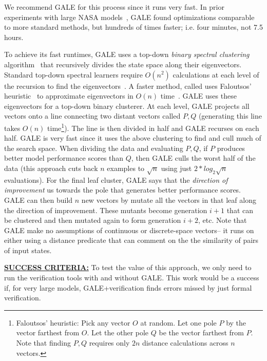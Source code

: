 \documentclass[12pt]{article}
\begin{document}
We recommend GALE for this process since it runs very fast.
In prior experiments with large NASA models~\cite{me15z}, GALE  found optimizations comparable to more standard methods, but hundreds of times faster; i.e. four minutes, not 7.5 hours.


To achieve its fast runtimes,
GALE uses  a top-down  {\em binary spectral clustering} algorithm~\cite{kamvar03} 
that recursively divides
the state space along their eigenvectors.
Standard top-down spectral learners require  $O(n^2)$ calculations at each level 
of the recursion to find the eigenvectors~\cite{boley98}. A faster method, called  
uses Faloutsos'  heuristic~\cite{Faloutsos1995} to
approximate eigenvectors   in $O(n)$ time~\cite{platt05}.
GALE uses these eigenvectors for a top-down binary clusterer. 
At each level, GALE  projects all  vectors onto a line connecting two distant vectors called $P,Q$ (generating this line takes $O(n)$ time\footnote{Faloutsos’ heuristic: Pick any vector $O$ at random. Let one pole $P$ by the
vector farthest from $O$. Let the other pole $Q$ be the vector farthest from $P$. Note that
finding $P,Q$ requires only $2n$ distance calculations across $n$ vectors.}).
The line is then divided in half
and GALE recurses on each half. 
GALE is very fast since it uses the above clustering to find and cull much of the  search space. When dividing the data and  evaluating   $P,Q$, if $P$ produces better model performance scores than $Q$, then GALE  culls   the worst half of the data (this approach cuts back $n$ examples to $\sqrt{n}$ using just $2*log_2{\sqrt{n}}$ evaluations).  For the final leaf cluster, GALE says that the {\em direction of improvement} us towards the pole that generates better performance scores. GALE can then build $n$ new vectors by mutate all the vectors in that leaf along the direction of improvement. These mutants become generation $i+1$ that can be clustered  and then mutated again to form generation $i+2$, etc. Note that  GALE make no assumptions of continuous or discrete-space vectors-- it runs on either using a distance predicate that can comment on the the similarity of pairs of input states. 

 
\underline{{\bf  SUCCESS CRITERIA:}}  To test
the value of this approach, we only
need to run the verification tools with and without
GALE. This work would be a success if, for very large models,
GALE+verification finds errors missed by just formal verification.
 
\end{document}

